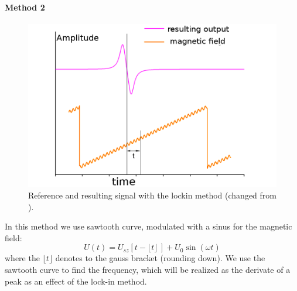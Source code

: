\paragraph{Method 2} 
\begin{figure}[htpb]
    \centering
    \includegraphics[width=0.8\linewidth]{figures/lockin2}
    \caption{Reference and resulting signal with the lockin method
        (changed from \cite{ver}).}
    \label{fig:lockin2}
\end{figure}
In this method we use sawtooth curve, modulated
with a sinus for the magnetic field:
\begin{equation}
   U(t) = U_{sz} \left[ t - \lfloor t \rfloor \,  \right] + U_0 \sin(\omega t)
\end{equation}
where the $\lfloor t \rfloor$ denotes to the gauss bracket (rounding down). 
We use the sawtooth curve to find the frequency, which will be 
realized as the derivate of a peak as an effect of the lock-in method.

